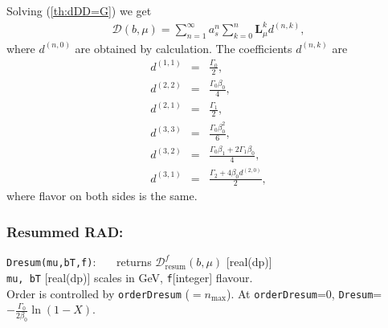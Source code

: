 \documentclass[prd,nofootinbib,eqsecnum,final]{revtex4}
\renewcommand{\(}{\left(}
\renewcommand{\)}{\right)}
\renewcommand{\[}{\left[}
\renewcommand{\]}{\right]}
\begin{document}
Solving (\ref{th:dDD=G}) we get
\begin{eqnarray}
\mathcal{D}(b,\mu)=\sum_{n=1}^\infty a_s^n \sum_{k=0}^n \mathbf{L}_\mu^k d^{(n,k)},
\end{eqnarray}
where $d^{(n,0)}$ are obtained by calculation. The coefficients $d^{(n,k)}$ are
\begin{eqnarray*}
d^{(1,1)}&=&\frac{\Gamma_0}{2},
\\
d^{(2,2)}&=&\frac{\Gamma_0\beta_0}{4},
\\
d^{(2,1)}&=&\frac{\Gamma_1}{2},
\\
d^{(3,3)}&=&\frac{\Gamma_0\beta_0^2}{6},
\\
d^{(3,2)}&=&\frac{\Gamma_0\beta_1+2\Gamma_1\beta_0}{4},
\\
d^{(3,1)}&=&\frac{\Gamma_2+4\beta_0 d^{(2,0)}}{2},
\end{eqnarray*}
where flavor on both sides is the same.

\subsubsection{Resummed RAD:}
\begin{tcolorbox}
\texttt{Dresum(mu,bT,f)}: ~~~returns $\mathcal{D}_{\text{resum}}^f(b,\mu)$ [real(dp)]
\\
\texttt{mu, bT} [real(dp)] scales in GeV, \texttt{f}[integer] flavour. 
\\
Order is controlled by \texttt{orderDresum} ($=n_{\text{max}}$). At \texttt{orderDresum}=0, \texttt{Dresum}=$-\frac{\Gamma_0}{2\beta_0}\ln(1-X)$.
\end{tcolorbox}
\end{document}

